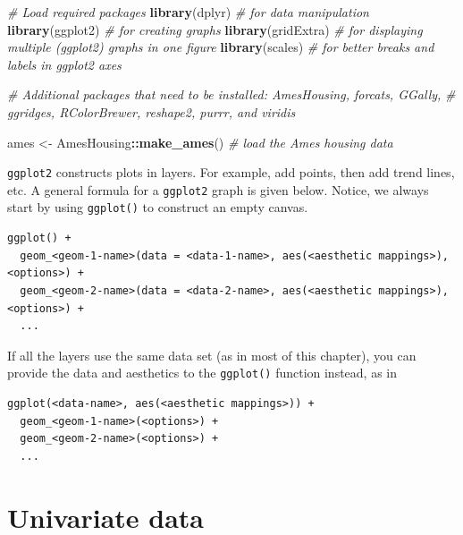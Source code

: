 \documentclass[]{book}
\newenvironment{Shaded}{\begin{snugshade}}{\end{snugshade}}
\newcommand{\CommentTok}[1]{\textcolor[rgb]{0.56,0.35,0.01}{\textit{#1}}}
\newcommand{\KeywordTok}[1]{\textcolor[rgb]{0.13,0.29,0.53}{\textbf{#1}}}
\newcommand{\NormalTok}[1]{#1}
\newcommand{\OperatorTok}[1]{\textcolor[rgb]{0.81,0.36,0.00}{\textbf{#1}}}
\newcommand{\StringTok}[1]{\textcolor[rgb]{0.31,0.60,0.02}{#1}}
\theoremstyle{definition}
\theoremstyle{definition}
\theoremstyle{definition}
\theoremstyle{remark}
\begin{document}
\begin{Shaded}
\begin{Highlighting}[]
\CommentTok{# Load required packages}
\KeywordTok{library}\NormalTok{(dplyr)         }\CommentTok{# for data manipulation}
\KeywordTok{library}\NormalTok{(ggplot2)       }\CommentTok{# for creating graphs}
\KeywordTok{library}\NormalTok{(gridExtra)     }\CommentTok{# for displaying multiple (ggplot2) graphs in one figure}
\KeywordTok{library}\NormalTok{(scales)        }\CommentTok{# for better breaks and labels in ggplot2 axes}

\CommentTok{# Additional packages that need to be installed: AmesHousing, forcats, GGally, }
\CommentTok{# ggridges, RColorBrewer, reshape2, purrr, and viridis}
\end{Highlighting}
\end{Shaded}

\begin{Shaded}
\begin{Highlighting}[]
\NormalTok{ames <-}\StringTok{ }\NormalTok{AmesHousing}\OperatorTok{::}\KeywordTok{make_ames}\NormalTok{()  }\CommentTok{# load the Ames housing data}
\end{Highlighting}
\end{Shaded}

\texttt{ggplot2} constructs plots in layers. For example, add points,
then add trend lines, etc. A general formula for a \texttt{ggplot2}
graph is given below. Notice, we always start by using \texttt{ggplot()}
to construct an empty canvas.

\begin{verbatim}
ggplot() +
  geom_<geom-1-name>(data = <data-1-name>, aes(<aesthetic mappings>), <options>) +
  geom_<geom-2-name>(data = <data-2-name>, aes(<aesthetic mappings>), <options>) +
  ...
\end{verbatim}

If all the layers use the same data set (as in most of this chapter),
you can provide the data and aesthetics to the \texttt{ggplot()}
function instead, as in

\begin{verbatim}
ggplot(<data-name>, aes(<aesthetic mappings>)) +
  geom_<geom-1-name>(<options>) +
  geom_<geom-2-name>(<options>) +
  ...
\end{verbatim}

\hypertarget{univariate-data}{%
\section{Univariate data}\label{univariate-data}}
\end{document}
